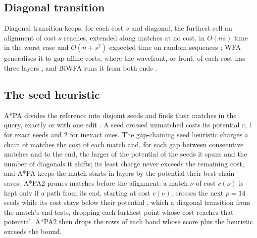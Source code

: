 \subsection{Diagonal transition}

Diagonal transition keeps, for each cost \(s\) and diagonal, the furthest cell an alignment of cost \(s\) reaches, extended along matches at no cost, in \(O(ns)\) time in the worst case and \(O(n + s^2)\) expected time on random sequences \citep{Ukkonen1985,Myers1986ond}; WFA generalises it to gap-affine costs, where the wavefront, or front, of each cost has three layers \citep{MarcoSola2021wfa}, and BiWFA runs it from both ends \citep{MarcoSola2023biwfa}.

\subsection{The seed heuristic}

A*PA divides the reference into disjoint seeds and finds their matches in the query, exactly or with one edit \citep{GrootKoerkamp2024astarpa}. A seed crossed unmatched costs its potential \(r\), 1 for exact seeds and 2 for inexact ones. The gap-chaining seed heuristic charges a chain of matches the cost of each match and, for each gap between consecutive matches and to the end, the larger of the potential of the seeds it spans and the number of diagonals it shifts; its least charge never exceeds the remaining cost, and A*PA keeps the match starts in layers by the potential their best chain saves. A*PA2 prunes matches before the alignment: a match \(\nu\) of cost \(c(\nu)\) is kept only if a path from its end, starting at cost \(c(\nu)\), crosses the next \(p = 14\) seeds while its cost stays below their potential \citep{GrootKoerkamp2024astarpa2}, which a diagonal transition from the match's end tests, dropping each furthest point whose cost reaches that potential. A*PA2 then drops the rows of each band whose score plus the heuristic exceeds the bound.
